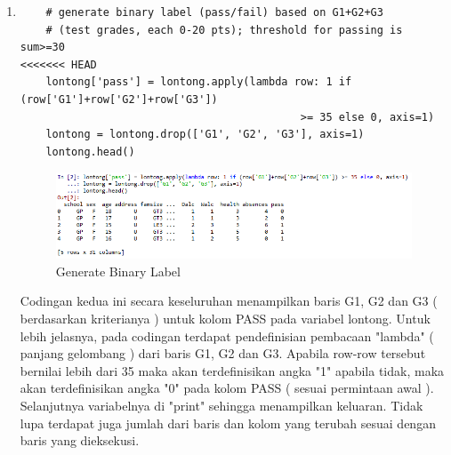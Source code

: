 \begin{enumerate}
\item
\begin{verbatim}
	# generate binary label (pass/fail) based on G1+G2+G3 
	# (test grades, each 0-20 pts); threshold for passing is sum>=30
<<<<<<< HEAD
	lontong['pass'] = lontong.apply(lambda row: 1 if (row['G1']+row['G2']+row['G3']) 
											>= 35 else 0, axis=1)
	lontong = lontong.drop(['G1', 'G2', 'G3'], axis=1)
	lontong.head()
\end{verbatim}
\begin{figure}[ht]
\centering
\includegraphics[scale=0.6]{figures/lontong/2.png}
\caption{Generate Binary Label}
\end{figure}
\par
	Codingan kedua ini secara keseluruhan menampilkan  baris  G1, G2 dan G3 ( berdasarkan kriterianya ) untuk kolom PASS pada variabel lontong. Untuk lebih jelasnya, pada codingan terdapat pendefinisian pembacaan "lambda" ( panjang gelombang ) dari baris G1, G2 dan G3. Apabila row-row tersebut bernilai lebih dari 35 maka akan terdefinisikan angka "1" apabila tidak, maka akan terdefinisikan angka "0" pada kolom PASS ( sesuai permintaan awal ). Selanjutnya variabelnya di "print" sehingga menampilkan keluaran. Tidak lupa terdapat juga jumlah dari baris dan kolom yang terubah sesuai dengan baris yang dieksekusi.



\end{enumerate}
